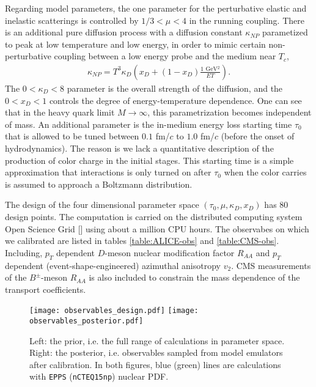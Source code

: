 Regarding model parameters, the one parameter for the perturbative elastic and inelastic scatterings is controlled by $1/3 < \mu < 4$ in the running coupling. 
There is an additional pure diffusion process with a diffusion constant $\kappa_{NP}$ parametized to peak at low temperature and low energy, in order to mimic certain non-perturbative coupling between a low energy probe and the medium near $T_c$,
\begin{eqnarray}
\kappa_{NP} = T^3 \kappa_D \left(x_D + (1-x_D)\frac{1\textrm{ GeV}{}^2}{ET}\right).
\end{eqnarray}
The $0<\kappa_D<8$ parameter is the overall strength of the diffusion, and the $0<x_D<1$ controls the degree of energy-temperature dependence.
One can see that in the heavy quark limit $M\rightarrow \infty$, this parametrization becomes independent of mass.
An additional parameter is the in-medium energy loss starting time $\tau_0$ that is allowed to be tuned between $0.1$ fm/$c$ to $1.0$ fm/$c$ (before the onset of hydrodynamics).
The reason is we lack a quantitative description of the production of color charge in the initial stages.
This starting time is a simple approximation that interactions is only turned on after $\tau_0$ when the color carries is assumed to approach a Boltzmann distribution.


The design of the four dimensional parameter space  $(\tau_0, \mu, \kappa_D, x_D)$ has 80 design points.
The computation is carried on the distributed computing system Open Science Grid [] using about a million CPU hours.
The observabes on which we calibrated are listed in tables \ref{table:ALICE-obs} and \ref{table:CMS-obs}. 
Including, $p_T$ dependent $D$-meson nuclear modification factor $R_{AA}$ and $p_T$ dependent (event-shape-engineered) azimuthal anisotropy $v_2$.
CMS measurements of the $B^{\pm}$-meson $R_{AA}$ is also included to constrain the mass dependence of the transport coefficients.

\begin{figure*}
\texttt{[image: observables\_design.pdf]}
\texttt{[image: observables\_posterior.pdf]}
\caption{Left: the prior, i.e. the full range of calculations in parameter space. Right: the posterior, i.e. observables sampled from model emulators after calibration. In both figures, blue (green) lines are calculations with {\tt EPPS} ({\tt nCTEQ15np}) nuclear PDF.}\label{plots:deisgn_posterior_obs}
\end{figure*}

